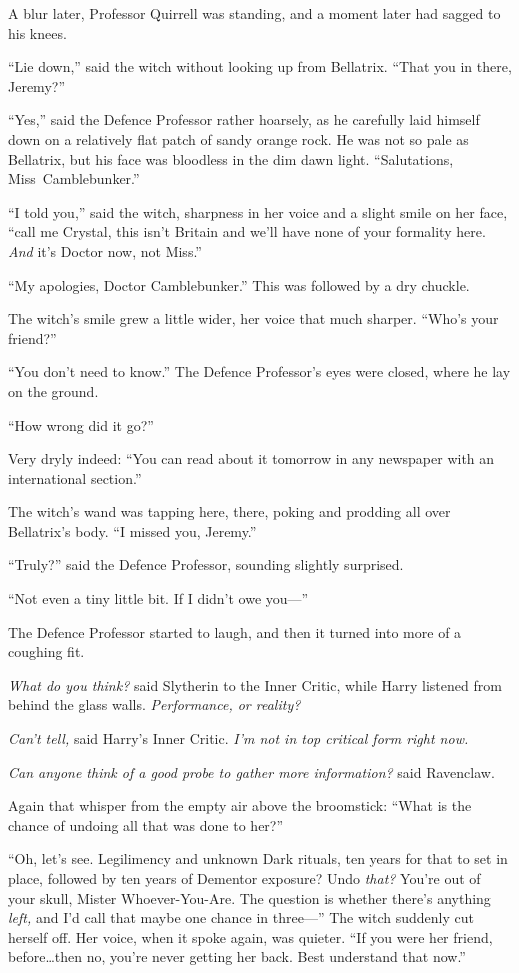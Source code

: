 A blur later, Professor Quirrell was standing, and a moment later had sagged to his knees.

“Lie down,” said the witch without looking up from Bellatrix. “That you in there, Jeremy?”

“Yes,” said the Defence Professor rather hoarsely, as he carefully laid himself down on a relatively flat patch of sandy orange rock. He was not so pale as Bellatrix, but his face was bloodless in the dim dawn light. “Salutations, Miss~Camblebunker.”

“I told you,” said the witch, sharpness in her voice and a slight smile on her face, “call me Crystal, this isn’t Britain and we’ll have none of your formality here. \emph{And} it’s Doctor now, not Miss.”

“My apologies, Doctor Camblebunker.” This was followed by a dry chuckle.

The witch’s smile grew a little wider, her voice that much sharper. “Who’s your friend?”

“You don’t need to know.” The Defence Professor’s eyes were closed, where he lay on the ground.

“How wrong did it go?”

Very dryly indeed: “You can read about it tomorrow in any newspaper with an international section.”

The witch’s wand was tapping here, there, poking and prodding all over Bellatrix’s body. “I missed you, Jeremy.”

“Truly?” said the Defence Professor, sounding slightly surprised.

“Not even a tiny little bit. If I didn’t owe you—”

The Defence Professor started to laugh, and then it turned into more of a coughing fit.

\emph{What do you think?} said Slytherin to the Inner Critic, while Harry listened from behind the glass walls. \emph{Performance, or reality?}

\emph{Can’t tell,} said Harry’s Inner Critic. \emph{I’m not in top critical form right now.}

\emph{Can anyone think of a good probe to gather more information?} said Ravenclaw.

Again that whisper from the empty air above the broomstick: “What is the chance of undoing all that was done to her?”

“Oh, let’s see. Legilimency and unknown Dark rituals, ten years for that to set in place, followed by ten years of Dementor exposure? Undo \emph{that?} You’re out of your skull, Mister Whoever-You-Are. The question is whether there’s anything \emph{left,} and I’d call that maybe one chance in three—” The witch suddenly cut herself off. Her voice, when it spoke again, was quieter. “If you were her friend, before…then no, you’re never getting her back. Best understand that now.”

